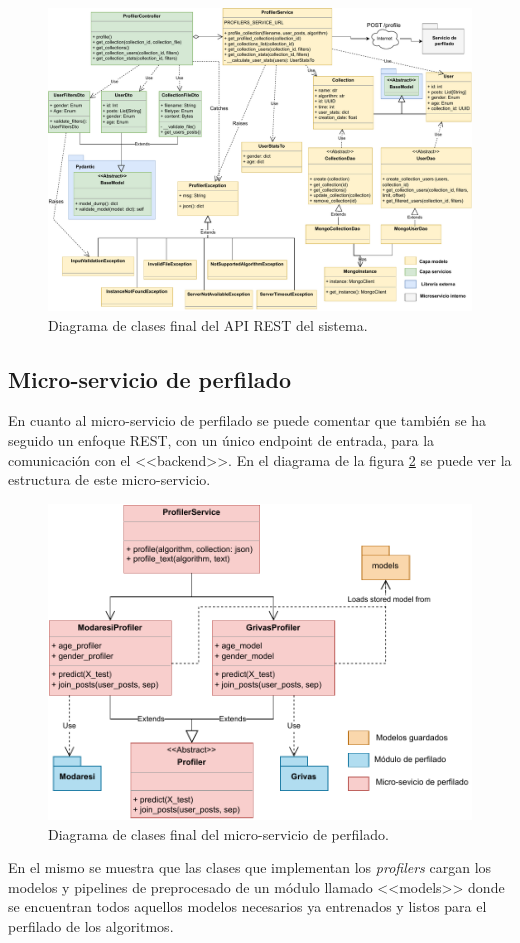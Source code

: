 \begin{figure}[H]
  \centering
  \includegraphics[width=\textwidth]{imaxes/diagramas/backend-classes.pdf}
  \caption{Diagrama de clases final del API REST del sistema.}  \label{fig:diagrama/api}
\end{figure}

\subsection{Micro-servicio de perfilado}
En cuanto al micro-servicio de perfilado se puede comentar que también se ha seguido un enfoque REST, con un único endpoint de entrada, para la comunicación con el <<backend>>. En el diagrama de la figura \ref{fig:diagrama/micro-servicio} se puede ver la estructura de este micro-servicio.
\begin{figure}[H]
  \centering
  \includegraphics[width=\textwidth]{imaxes/diagramas/profiler-service.pdf}
  \caption{Diagrama de clases final del micro-servicio de perfilado.}  \label{fig:diagrama/micro-servicio}
\end{figure}
En el mismo se muestra que las clases que implementan los \textit{profilers} cargan los modelos y pipelines de preprocesado de un módulo llamado <<models>> donde se encuentran todos aquellos modelos necesarios ya entrenados y listos para el perfilado de los algoritmos.

